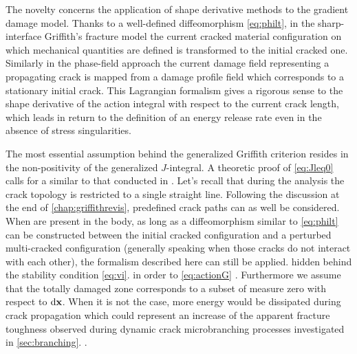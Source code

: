 The novelty concerns the application of shape derivative methods \cite{Destuynder:1981} to the gradient damage model. Thanks to a well-defined diffeomorphism \eqref{eq:philt}, in the sharp-interface Griffith's fracture model the current cracked material configuration on which mechanical quantities are defined is transformed to the initial cracked one. Similarly in the phase-field approach the current damage field representing a propagating crack is mapped from a damage profile field which corresponds to a stationary initial crack. This Lagrangian formalism gives a rigorous sense to the shape derivative of the action integral with respect to the current crack length, which leads in return to the definition of an energy release rate even in the absence of stress singularities.

The most essential assumption behind the generalized Griffith criterion resides in the non-positivity of the generalized $J$-integral. A theoretic proof of \cref{eq:Jleq0} calls for a  similar to that conducted in \cite{SicsicMarigo:2013}. Let's recall that during the analysis the crack topology is restricted to a single straight line. Following the discussion at the end of \cref{chap:griffithrevis}, predefined  crack paths can as well be considered. When  are present in the body, as long as a diffeomorphism similar to \eqref{eq:philt} can be constructed between the initial cracked configuration and a perturbed multi-cracked configuration (generally speaking when those cracks do not interact with each other), the formalism described here can still be applied.  hidden behind the stability condition \eqref{eq:vi}.  \cite{Hintermuller:2011} in order to  \eqref{eq:actionG} . Furthermore we assume that the totally damaged zone corresponds to a subset of measure zero with respect to $\md\vec{x}$. When it is not the case, more energy would be dissipated during crack propagation which could represent an increase of the apparent fracture toughness observed during dynamic crack microbranching processes investigated in \cref{sec:branching}. .

